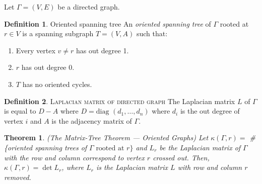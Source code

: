 \documentclass[11pt]{article}
\newtheorem{theorem}{Theorem}[section]
\theoremstyle{definition}
\newtheorem{definition}{Definition}[section]
\begin{document}
	Let $\Gamma = (V,E)$ be a directed graph.
	
	\theoremstyle{definition}
	\begin{definition}{Oriented spanning tree}
			An \emph{oriented spanning tree} of $\Gamma$ rooted at $r \in V$ is a spanning subgraph $T = (V,A)$ such that:
			\begin{enumerate}
				\item Every vertex $v \neq r$ has out degree 1.
				\item $r$ has out degree 0.
				\item $T$ has no oriented cycles.
			\end{enumerate}
	\end{definition}
	
	\theoremstyle{definition}
	\begin{definition}{\textsc{Laplacian matrix of directed graph}}
			The Laplacian matrix $L$ of $\Gamma$ is equal to $D-A$ where $D = \text{diag } (d_1, \dots, d_n)$ where $d_i$ is the out degree of vertex $i$ and $A$ is the adjacency matrix of $\Gamma$.
	\end{definition}
	
	\begin{theorem}{(The Matrix-Tree Theorem --- Oriented Graphs)}
			Let $\kappa(\Gamma, r) =$ \# \{oriented spanning trees of $\Gamma \text{ rooted at } r\}$ and $L_r$ be the Laplacian matrix of $\Gamma$ with the row and column correspond to vertex $r$ crossed out. 
			Then, $\kappa(\Gamma, r) = \det L_r$, where $L_r$ is the Laplacian matrix $L$ with row and column $r$ removed.
	\end{theorem}
	
\end{document}
